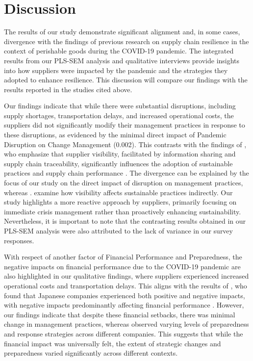 \chapter{Discussion}

The results of our study demonstrate significant alignment and, in some cases, divergence with the findings of previous research on supply chain resilience in the context of perishable goods during the COVID-19 pandemic. The integrated results from our PLS-SEM analysis and qualitative interviews provide insights into how suppliers were impacted by the pandemic and the strategies they adopted to enhance resilience. This discussion will compare our findings with the results reported in the studies cited above.

Our findings indicate that while there were substantial disruptions, including supply shortages, transportation delays, and increased operational costs, the suppliers did not significantly modify their management practices in response to these disruptions, as evidenced by the minimal direct impact of Pandemic Disruption on Change Management (0.002). This contrasts with the findings of \textcite{Sharma2022ImpactPerspective}, who emphasize that supplier visibility, facilitated by information sharing and supply chain traceability, significantly influences the adoption of sustainable practices and supply chain performance \parencite{Sharma2022ImpactPerspective}. The divergence can be explained by the focus of our study on the direct impact of disruption on management practices, whereas \textcite{Sharma2022ImpactPerspective}. examine how visibility affects sustainable practices indirectly. Our study highlights a more reactive approach by suppliers, primarily focusing on immediate crisis management rather than proactively enhancing sustainability. Nevertheless, it is important to note that the contrasting results obtained in our PLS-SEM analysis were also attributed to the lack of variance in our survey responses. 

With respect of another factor of Financial Performance and Preparedness, the negative impacts on financial performance due to the COVID-19 pandemic are also highlighted in our qualitative findings, where suppliers experienced increased operational costs and transportation delays. This aligns with the results of \textcite{Maharjan2023LogisticsPandemic}, who found that Japanese companies experienced both positive and negative impacts, with negative impacts predominantly affecting financial performance \parencite{Maharjan2023LogisticsPandemic}. However, our findings indicate that despite these financial setbacks, there was minimal change in management practices, whereas \textcite{Maharjan2023LogisticsPandemic} observed varying levels of preparedness and response strategies across different companies. This suggests that while the financial impact was universally felt, the extent of strategic changes and preparedness varied significantly across different contexts. 

